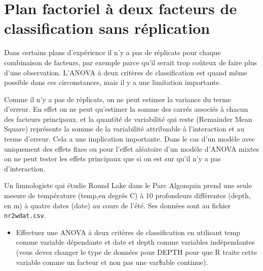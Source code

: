 \documentclass[
  12pt,
]{book}
\makeatletter
\newenvironment{Shaded}{\begin{snugshade}}{\end{snugshade}}
\newcommand{\DataTypeTok}[1]{\textcolor[rgb]{0.13,0.29,0.53}{#1}}
\newcommand{\DecValTok}[1]{\textcolor[rgb]{0.00,0.00,0.81}{#1}}
\newcommand{\KeywordTok}[1]{\textcolor[rgb]{0.13,0.29,0.53}{\textbf{#1}}}
\newcommand{\NormalTok}[1]{#1}
\newcommand{\OperatorTok}[1]{\textcolor[rgb]{0.81,0.36,0.00}{\textbf{#1}}}
\newcommand{\StringTok}[1]{\textcolor[rgb]{0.31,0.60,0.02}{#1}}
\providecommand{\tightlist}{%
  \setlength{\itemsep}{0pt}\setlength{\parskip}{0pt}}
\newenvironment{kframe}{%
\medskip{}
\setlength{\fboxsep}{.8em}
\def\at@end@of@kframe{}%
\ifinner\ifhmode%
 \def\at@end@of@kframe{\end{minipage}}%
 \begin{minipage}{\columnwidth}%
\fi\fi%
\def\FrameCommand##1{\hskip\@totalleftmargin \hskip-\fboxsep
\colorbox{incolor}{##1}\hskip-\fboxsep
    \hskip-\linewidth \hskip-\@totalleftmargin \hskip\columnwidth}%
\MakeFramed {\advance\hsize-\width
  \@totalleftmargin\z@ \linewidth\hsize
  \@setminipage}}%
{\par\unskip\endMakeFramed%
\at@end@of@kframe}
\newenvironment{rmdblock}[1]
 {
 \begin{itemize}
 \renewcommand{\labelitemi}{
   \raisebox{-.7\height}[0pt][0pt]{
     {\setkeys{Gin}{width=3em,keepaspectratio}\texttt{[image: images/\#1]}}
   }
 }
 \begin{kframe}
 \setlength{\fboxsep}{1em}
 \item
 }
 {
 \end{kframe}
 \end{itemize}
 }
\newenvironment{rmdwarning}
  {\begin{rmdblock}{warning}}
  {\end{rmdblock}}
\makeatother
\begin{document}
\hypertarget{plan-factoriel-uxe0-deux-facteurs-de-classification-sans-ruxe9plication}{%
\section{Plan factoriel à deux facteurs de classification sans réplication}\label{plan-factoriel-uxe0-deux-facteurs-de-classification-sans-ruxe9plication}}

Dans certains plans d'expérience il n'y a pas de réplicats pour chaque combinaison de facteurs, par exemple parce qu'il serait trop coûteux de faire plus d'une observation. L'ANOVA à deux critères de classification est quand même possible dans ces circonstances, mais il y a une limitation importante.

\begin{rmdwarning}
Comme il n'y a pas de réplicats, on ne peut estimer la variance du terme d'erreur. En effet on ne peut qu'estimer la somme des carrés associés à chacun des facteurs principaux, et la quantité de variabilité qui reste (Remainder Mean Square) représente la somme de la variabilité attribuable à l'interaction et au terme d'erreur. Cela a une implication importante. Dans le cas d'un modèle avec uniquement des effets fixes ou pour l'effet aléatoire d'un modèle d'ANOVA mixtes on ne peut tester les effets principaux que si on est sur qu'il n'y a pas d'interaction.
\end{rmdwarning}

Un limnologiste qui étudie Round Lake dans le Parc Algonquin prend une seule mesure de température (temp,en degrés C) à 10 profondeurs différentes (depth, en m) à quatre dates (date) au cours de l'été. Ses données sont au fichier \texttt{nr2wdat.csv}.

\begin{itemize}
\tightlist
\item
  Effectuez une ANOVA à deux critères de classification en utilisant temp comme variable dépendante et date et depth comme variables indépendantes (vous devez changer le type de données pour DEPTH pour que R traite cette variable comme un facteur et non pas une var\$able continue).
\end{itemize}

\begin{Shaded}
\end{Shaded}
\end{document}

